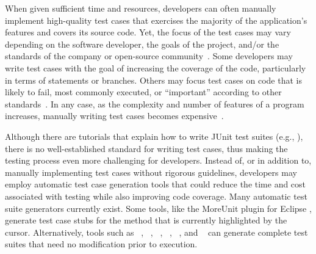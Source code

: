 
When given sufficient time and resources, developers can often manually implement high-quality test cases that exercises the majority of the application's features and covers its source code.  Yet, the focus of the test cases may vary depending on the software developer, the goals of the project, and/or the standards of the company or open-source community~\cite{kochhar2013}.  Some developers may write test cases with the goal of increasing the coverage of the code, particularly in terms of statements or branches.  Others may focus test cases on code that is likely to fail, most commonly executed, or ``important'' according to other standards~\cite{mockus2009}. In any case, as the complexity and number of features of a program increases, manually writing test cases becomes expensive~\cite{clarke1998automated}.%



Although there are tutorials that explain how to write JUnit test suites (e.g., \cite{vogella2013}), there is no well-established standard for writing test cases, thus making the testing process even more challenging for developers.  Instead of, or in addition to, manually implementing test cases without rigorous guidelines, developers may employ automatic test case generation tools that could reduce the time and cost associated with testing while also improving code coverage.  Many automatic test suite generators currently exist.  Some tools, like the MoreUnit plugin for Eclipse \cite{moreunit}, generate test case stubs for the method that is currently highlighted by the cursor.  Alternatively, tools such as \codepro~\cite{CodePro1}, \evo~\cite{fraser:2011:eat:2025113.2025179}, \jcrasher~\cite{csallner2004}, \palus~\cite{zhang:2011:pha:1985793.1986036}, \randoop~\cite{pacheco2007feedback}, and \testera~\cite{marinov:2001:tnf:872023.872551} can generate complete test suites that need no modification prior to execution.

